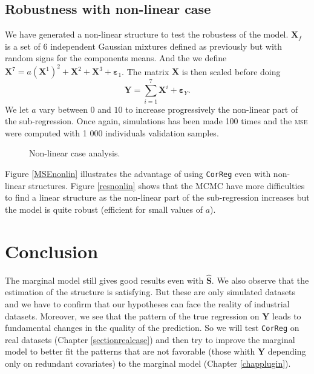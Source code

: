 \documentclass[12pt,a4paper]{report}
\begin{document}
\subsection{Robustness with non-linear case}

We have generated a non-linear structure to test the robustess of the model. $\boldsymbol{X}_f$ is a set of 6 independent Gaussian mixtures defined as previously but with random signs for the components means. And the we define $%
\boldsymbol{X}^7%
=a(\boldsymbol{X}^1)^2+\boldsymbol{X}^2+\boldsymbol{X}^3+ \boldsymbol{\varepsilon}_1$. The matrix $\boldsymbol{X}$ is then scaled before doing $$\boldsymbol{Y}%
=\sum_{i=1}^7\boldsymbol{X}^i+\boldsymbol{\varepsilon}_Y.$$ We let $a$ vary between $0$ and $10$ to increase progressively the non-linear part of the sub-regression. Once again, simulations has been made 100 times and the \textsc{mse} were computed with 1 000 individuals validation samples.

 \begin{figure}[h!] 
   \caption{Non-linear case analysis.}
\end{figure}
Figure \ref{MSEnonlin} illustrates the advantage of using {\tt CorReg} even with non-linear structures. Figure \ref{resnonlin} shows that the MCMC have more difficulties to find a linear structure as the non-linear part of the sub-regression increases but the model is quite robust (efficient for small values of $a$).

	\FloatBarrier	

	\section{Conclusion} The marginal model still gives good results even with $\hat{\boldsymbol{S}}$. We also observe that the estimation of the structure is satisfying. But these are only simulated datasets and we have to confirm that our hypotheses can face the reality of industrial datasets. Moreover, we see that the pattern of the true regression on $\boldsymbol{Y}$ leads to fundamental changes in the quality of the prediction.	So we will test {\tt CorReg} on real datasets (Chapter \ref{sectionrealcase}) and then try to improve the marginal model to better fit the patterns that are not favorable (those whith $\boldsymbol{Y}$ depending only on redundant covariates) to the marginal model (Chapter \ref{chapplugin}).
		
\end{document}
